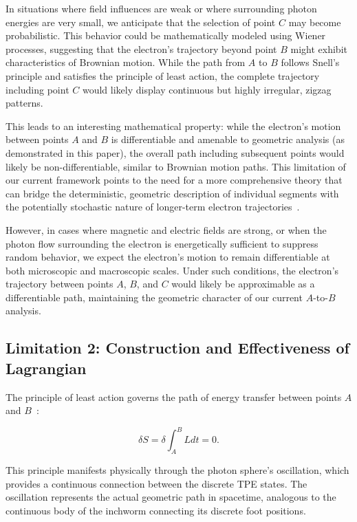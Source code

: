 \documentclass[%
 reprint,
 amsmath,amssymb,
 aps,
]{revtex4-1}
\numberwithin{equation}{section}%
\begin{document}
In situations where field influences are weak or where surrounding photon energies are very small, we anticipate that the selection of point $C$ may become probabilistic. This behavior could be mathematically modeled using Wiener processes, suggesting that the electron's trajectory beyond point $B$ might exhibit characteristics of Brownian motion. While the path from $A$ to $B$ follows Snell's principle and satisfies the principle of least action, the complete trajectory including point $C$ would likely display continuous but highly irregular, zigzag patterns.

This leads to an interesting mathematical property: while the electron's motion between points $A$ and $B$ is differentiable and amenable to geometric analysis (as demonstrated in this paper), the overall path including subsequent points would likely be non-differentiable, similar to Brownian motion paths. This limitation of our current framework points to the need for a more comprehensive theory that can bridge the deterministic, geometric description of individual segments with the potentially stochastic nature of longer-term electron trajectories~\cite{hanamura2023}.

However, in cases where magnetic and electric fields are strong, or when the photon flow surrounding the electron is energetically sufficient to suppress random behavior, we expect the electron's motion to remain differentiable at both microscopic and macroscopic scales. Under such conditions, the electron's trajectory between points $A$, $B$, and $C$ would likely be approximable as a differentiable path, maintaining the geometric character of our current $A$-to-$B$ analysis.


\subsection{\label{sec:Limitation 2}Limitation 2: Construction and Effectiveness of Lagrangian}

The principle of least action governs the path of energy transfer between points $A$ and $B$~\cite{misner1973}:

\begin{equation}
    \delta S = \delta \int_{A}^{B} L dt = 0.
    \label{eq:least_action_principle}
\end{equation}

This principle manifests physically through the photon sphere's oscillation, which provides a continuous connection between the discrete TPE states. The oscillation represents the actual geometric path in spacetime, analogous to the continuous body of the inchworm connecting its discrete foot positions.
\end{document}
